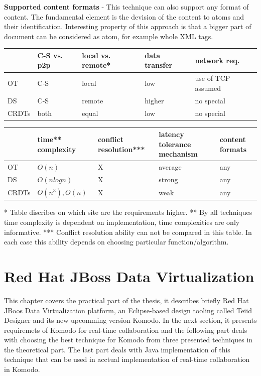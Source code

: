 \documentclass[12pt,oneside]{fithesis2}
\begin{document}
\vspace{3mm} 

\textbf{Supported content formats} - This technique can also support any format of content. The fundamental element is the devision of the content to atoms and their identification. Interesting property of this approach is that a bigger part of document can be considered as atom, for example whole XML tags.

\vspace{13mm} 
\newpage
\noindent
\begin{tabular}{| p{1.7cm} | p{2.2cm} | p{2.2cm} | p{2.2cm} | p{2.2cm} |}
\hline
 & C-S vs. p2p & local vs. remote* & data \newline transfer & network req.  \\
\hline
OT & C-S & local & low & use of TCP assumed \\
\hline
DS & C-S & remote & higher & no special \\
\hline
CRDTs & both & equal & low & no special \\
\hline
\end{tabular}
\newline
\vspace*{1 cm}
\newline
\begin{tabular}{| p{1.7cm} | p{2.2cm} | p{2.2cm} | p{2.2cm} | p{2.2cm} |}
\hline
 & time** \newline complexity & conflict resolution*** & latency tolerance  mechanism & content formats \\
\hline
OT &  \(O(n)\) & X & average  & any \\
\hline
DS & \(O(nlogn)\) & X & strong  & any \\
\hline
CRDTs & \(O(n^3), O(n)\) & X & weak  & any \\
\hline
\end{tabular}
\vspace{10mm}
\newline
* Table discribes on which site are the requirements higher. \newline
** By all techniques time complexity is dependent on implementation, time complexities are only informative. \newline
*** Conflict resolution ability can not be compared in this table. In each case this ability depends on choosing particular function/algorithm.
\chapter{Red Hat JBoss Data Virtualization}
\par This chapter covers the practical part of the thesis, it describes briefly Red Hat JBoos Data Virtualization platform, an Eclipse-based design tooling called Teiid Designer and its new upcomming version Komodo. In the next section, it presents requiremets of Komodo for real-time collaboration and the following part deals with choosing the best technique for Komodo from three presented techniques in the theoretical part. The last part deals with Java implementation of this technique that can be used in acctual implementation of real-time collaboration in Komodo.
\end{document}
